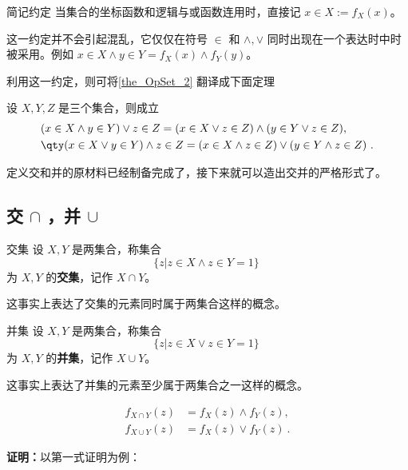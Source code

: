 \begin{definition}{简记约定}\label{def_OpSet_5}
当集合的坐标函数和逻辑与或函数连用时，直接记 $x\in X:=f_X(x)$。
\end{definition}
这一约定并不会引起混乱，它仅仅在符号 $\in$ 和 $\land,\lor$ 同时出现在一个表达时中时被采用。例如 $x\in X\land y\in Y=f_X(x)\land f_Y(y)$。

利用这一约定，则可将\autoref{the_OpSet_2}  翻译成下面定理
\begin{theorem}{}\label{the_OpSet_4}
设 $X,Y,Z$ 是三个集合，则成立
\begin{equation}
\begin{aligned}
&(x\in X\land y\in Y)\lor z\in Z=(x\in X\lor z\in Z)\land(y\in Y\lor z\in Z),\\
&\qty(x\in X\lor y\in Y)\land z\in Z=(x\in X\land z\in Z)\lor(y\in Y\land z\in Z)~.
\end{aligned}
\end{equation}
\end{theorem}

定义交和并的原材料已经制备完成了，接下来就可以造出交并的严格形式了。
\subsection{交 $\cap$ ，并 $\cup$}
\begin{definition}{交集}\label{def_OpSet_3}
设 $X,Y$ 是两集合，称集合
\begin{equation}\label{eq_OpSet_4}
\{z|z\in X\land z\in Y=1 \}~
\end{equation}
为 $X,Y$ 的\textbf{交集}，记作 $X\cap Y$。
\end{definition}
这事实上表达了交集的元素同时属于两集合这样的概念。
\begin{definition}{并集}\label{def_OpSet_4}
设 $X,Y$ 是两集合，称集合
\begin{equation}
\{z|z\in X\lor z\in Y=1 \}~
\end{equation}
为 $X,Y$ 的\textbf{并集}，记作 $X\cup Y$。
\end{definition}
这事实上表达了并集的元素至少属于两集合之一这样的概念。
\begin{theorem}{}\label{the_OpSet_3}
\begin{equation}
\begin{aligned}
f_{X\cap Y}(z)&=f_X(z)\land f_Y(z),\\
f_{X\cup Y}(z)&=f_X(z)\lor f_Y(z)~.
\end{aligned}
\end{equation}
\end{theorem}
\textbf{证明：}以第一式证明为例：

